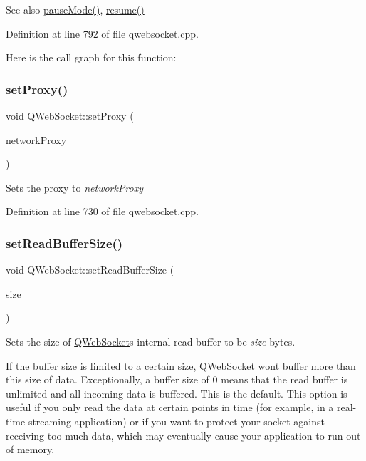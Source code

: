 \begin{DoxySeeAlso}{See also}
\mbox{\hyperlink{class_q_web_socket_a15778b8a5f6ffb83c61b5e9b1701eb28}{pause\+Mode()}}, \mbox{\hyperlink{class_q_web_socket_af21dbd52b116cc5dae811548000001ee}{resume()}} 
\end{DoxySeeAlso}


Definition at line 792 of file qwebsocket.\+cpp.

Here is the call graph for this function\+:
\mbox{\label{class_q_web_socket_ab567ac6d43bb2f0526a1a5d0e2872034}} 
\subsubsection{\texorpdfstring{set\+Proxy()}{setProxy()}}
{\footnotesize\ttfamily void Q\+Web\+Socket\+::set\+Proxy (\begin{DoxyParamCaption}\item[{const Q\+Network\+Proxy \&}]{network\+Proxy }\end{DoxyParamCaption})}

Sets the proxy to {\itshape network\+Proxy} 

Definition at line 730 of file qwebsocket.\+cpp.

\mbox{\label{class_q_web_socket_adc6582dd40792bb2c8309a4890236510}} 
\subsubsection{\texorpdfstring{set\+Read\+Buffer\+Size()}{setReadBufferSize()}}
{\footnotesize\ttfamily void Q\+Web\+Socket\+::set\+Read\+Buffer\+Size (\begin{DoxyParamCaption}\item[{qint64}]{size }\end{DoxyParamCaption})}

Sets the size of \mbox{\hyperlink{class_q_web_socket}{Q\+Web\+Socket}}\textquotesingle{}s internal read buffer to be {\itshape size} bytes.

If the buffer size is limited to a certain size, \mbox{\hyperlink{class_q_web_socket}{Q\+Web\+Socket}} won\textquotesingle{}t buffer more than this size of data. Exceptionally, a buffer size of 0 means that the read buffer is unlimited and all incoming data is buffered. This is the default. This option is useful if you only read the data at certain points in time (for example, in a real-\/time streaming application) or if you want to protect your socket against receiving too much data, which may eventually cause your application to run out of memory.

